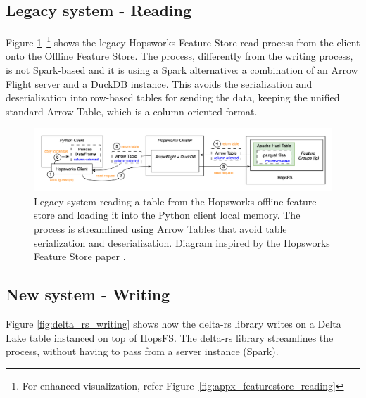 \subsection{Legacy system - Reading}
\label{subsec:legacy_sys_reading}

Figure \ref{fig:featurestore_reading}~\footnote{For enhanced visualization, refer Figure~\ref{fig:appx_featurestore_reading}} shows the legacy Hopsworks Feature Store read process from the client onto the Offline Feature Store. The process, differently from the writing process, is not Spark-based and it is using a Spark alternative: a combination of an Arrow Flight server and a DuckDB instance. This avoids the serialization and deserialization into row-based tables for sending the data, keeping the unified standard Arrow Table, which is a column-oriented format.

\begin{figure}
    \begin{center}
      \includegraphics[width=\textwidth]{figures/2-background/FeatureStore-reading.png}
    \end{center}
    \caption[Legacy system - Read process]{Legacy system reading a table from the Hopsworks offline feature store and loading it into the Python client local memory. The process is streamlined using Arrow Tables that avoid table serialization and deserialization. Diagram inspired by the Hopsworks Feature Store paper \cite{10.1145/3626246.3653389}.}
    \label{fig:featurestore_reading}
\end{figure}

\subsection{New system - Writing}

Figure \ref{fig:delta_rs_writing} shows how the delta-rs library writes on a Delta Lake table instanced on top of \gls{HopsFS}. The delta-rs library streamlines the process, without having to pass from a server instance (Spark).

